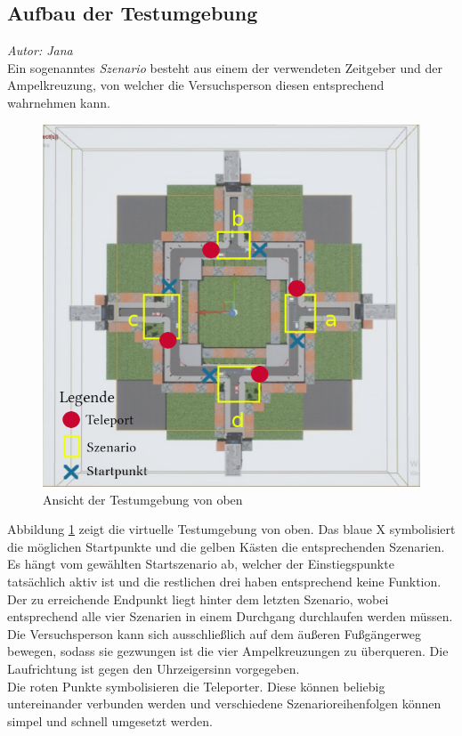 \documentclass{Bericht}
\begin{document}
	\newpage

\subsection{Aufbau der Testumgebung}
\textit{Autor: Jana}\\

Ein sogenanntes \textit{Szenario} besteht aus einem der verwendeten Zeitgeber und der Ampelkreuzung, von welcher die Versuchsperson diesen entsprechend wahrnehmen kann.
\begin{figure}[H]
	\centering
	\includegraphics[scale=0.8]{../Bilder/mapLegende.png}
	\caption{Ansicht der Testumgebung von oben}
	\label{img:map}
\end{figure}

Abbildung \ref{img:map} zeigt die virtuelle Testumgebung von oben. Das blaue X symbolisiert die möglichen Startpunkte und die gelben Kästen die entsprechenden Szenarien. Es hängt vom gewählten Startszenario ab, welcher der Einstiegspunkte tatsächlich aktiv ist und die restlichen drei haben entsprechend keine Funktion. Der zu erreichende Endpunkt liegt hinter dem letzten Szenario, wobei entsprechend alle vier Szenarien in einem Durchgang durchlaufen werden müssen. 
Die Versuchsperson kann sich ausschließlich auf dem äußeren Fußgängerweg bewegen, sodass sie gezwungen ist die vier Ampelkreuzungen zu überqueren. Die Laufrichtung ist gegen den Uhrzeigersinn vorgegeben.\\
Die roten Punkte symbolisieren die Teleporter. Diese können beliebig untereinander verbunden werden und verschiedene Szenarioreihenfolgen können simpel und schnell umgesetzt werden.\\
\end{document}
